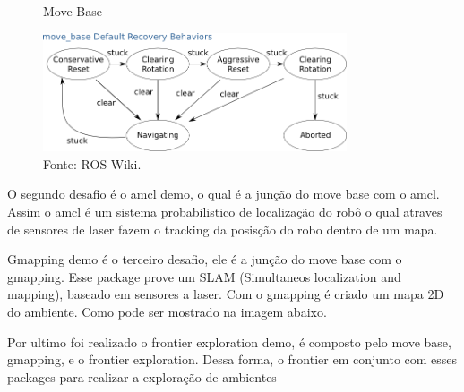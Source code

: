 
\begin{figure} [h!]
    \centering
    \caption{Move Base}
    \includegraphics[width=0.8\textwidth]{Figures/recovery_behaviors.png}
    \caption*{Fonte: ROS Wiki.}
    \label{fig:Move Base}
\end{figure}

O segundo desafio é o amcl demo, o qual é a junção do move base com o
amcl. Assim o amcl é um sistema probabilistico de localização do robô
o qual atraves de sensores de laser fazem o tracking da posisção do 
robo dentro de um mapa.


Gmapping demo é o terceiro desafio, ele é a junção do move base com o
gmapping. Esse package prove um SLAM (Simultaneos localization and mapping), 
baseado em sensores a laser. Com o gmapping é criado um mapa 2D do ambiente.
Como pode ser mostrado na imagem abaixo.


Por ultimo foi realizado o frontier exploration demo, é composto 
pelo move base, gmapping, e o frontier exploration. Dessa forma,
o frontier em conjunto com esses packages para realizar a 
exploração de ambientes





